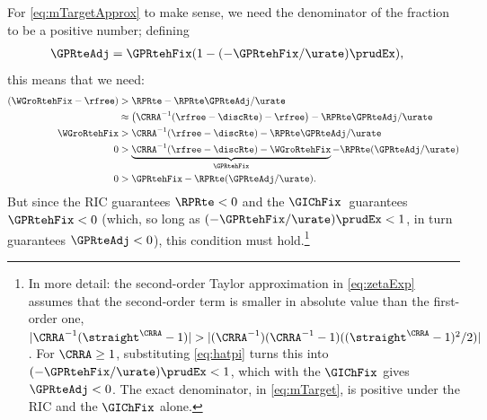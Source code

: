 \documentclass{econark}
\begin{document}
For \eqref{eq:mTargetApprox} to make sense, we need
the denominator of the fraction to be a positive number;
defining
\begin{equation}\begin{gathered}\begin{aligned}
  \GPRteAdj & =  \GPRtehFix(1-(-\GPRtehFix/\urate)\prudEx),
\end{aligned}\end{gathered}\end{equation}
this means that we need:
\begin{equation}\begin{gathered}\begin{aligned}
    (\WGroRtehFix - \rfree) & >  \RPRte - \RPRte\GPRteAdj/\urate
\\   & \approx  \left(\CRRA^{-1}(\rfree-\discRte)-\rfree\right)-  \RPRte\GPRteAdj/\urate
\\ \WGroRtehFix & >  \CRRA^{-1}(\rfree-\discRte)-  \RPRte\GPRteAdj/\urate
\\ 0 & >  \underbrace{\CRRA^{-1}(\rfree-\discRte) - \WGroRtehFix}_{\GPRtehFix} -  \RPRte(\GPRteAdj/\urate)
\\ 0 & >  \GPRtehFix -  \RPRte(\GPRteAdj/\urate) \label{eq:newDenom}
.
\end{aligned}\end{gathered}\end{equation}
But since the RIC guarantees $\RPRte<0$ and the $\GIChFix$~guarantees $\GPRtehFix<0$ (which, so long as $(-\GPRtehFix/\urate)\prudEx < 1$, in turn guarantees $\GPRteAdj < 0$), this condition must hold.\footnote{In more detail: the second-order Taylor approximation in \eqref{eq:zetaExp} assumes that the second-order term is smaller in absolute value than the first-order one, $|\CRRA^{-1} (\straight^{\CRRA}-1) | > |(\CRRA^{-1})(\CRRA^{-1}-1)((\straight^{\CRRA}-1)^{2}/2)|$.  For $\CRRA \geq 1$, substituting \eqref{eq:hatpi} turns this into $(-\GPRtehFix/\urate)\prudEx < 1$, which with the $\GIChFix$ gives $\GPRteAdj < 0$.  The exact denominator, in \eqref{eq:mTarget}, is positive under the RIC and the $\GIChFix$ alone.}
\end{document}
